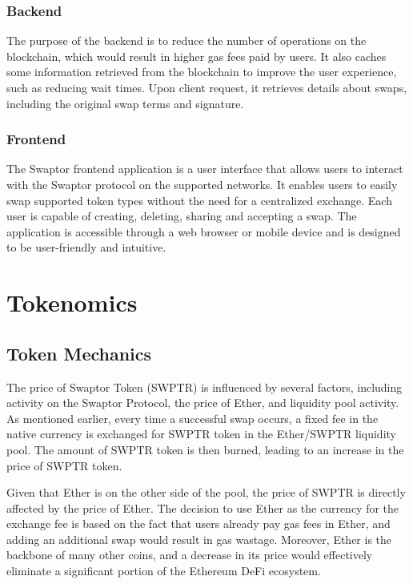 \documentclass[12pt]{article}
\begin{document}
  \subsubsection{Backend}
  The purpose of the backend is to reduce the number of operations on the blockchain,
  which would result in higher gas fees paid by users. It also caches some information
  retrieved from the blockchain to improve the user experience, such as reducing wait
  times. Upon client request, it retrieves details about swaps, including the original
  swap terms and signature.

  \subsubsection{Frontend}
  The Swaptor frontend application is a user interface that allows users to interact
  with the Swaptor protocol on the supported networks. It enables users to easily swap
  supported token types without the need for a centralized exchange. Each user is capable
  of creating, deleting, sharing and accepting a swap. The application is accessible through a
  web browser or mobile device and is designed to be user-friendly and intuitive.

  \section{Tokenomics}

  \subsection{Token Mechanics}

  The price of Swaptor Token (SWPTR) is influenced by several factors,
  including activity on the Swaptor Protocol, the price of Ether,
  and liquidity pool activity. As mentioned earlier, every time a
  successful swap occurs, a fixed fee in the native currency is
  exchanged for SWPTR token in the Ether/SWPTR liquidity pool.
  The amount of SWPTR token is then burned, leading to an increase
  in the price of SWPTR token.

  Given that Ether is on the other side of the pool, the price of
  SWPTR is directly affected by the price of Ether. The decision to
  use Ether as the currency for the exchange fee is based on the fact
  that users already pay gas fees in Ether, and adding an additional
  swap would result in gas wastage. Moreover, Ether is the backbone of
  many other coins, and a decrease in its price would effectively
  eliminate a significant portion of the Ethereum DeFi ecosystem.
\end{document}
